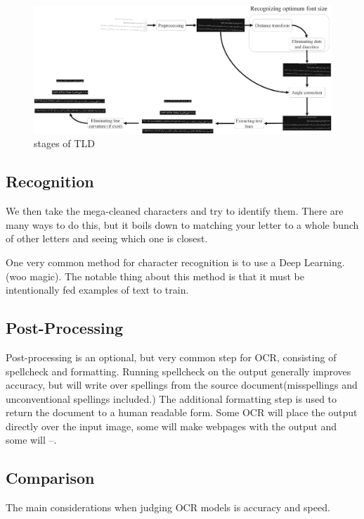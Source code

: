 \documentclass[sigplan,screen,nonacm]{acmart-tagged}
\begin{document}
\begin{figure}
  \includegraphics[width=\linewidth]{TLD.png}
  \caption{stages of TLD}
  \label{fig:tld}
\end{figure}

\subsection{Recognition}
\label{Recognition}

We then take the mega-cleaned characters and try to identify them. There are many ways to do this, but it boils down to matching your letter to a whole bunch of other letters and seeing which one is closest.

One very common method for character recognition is to use a Deep Learning. (woo magic). The notable thing about this method is that it must be intentionally fed examples of text to train.

\subsection{Post-Processing}
\label{sec:Post-Processing}

Post-processing is an optional, but very common step for OCR, consisting of spellcheck and formatting. Running spellcheck on the output generally improves accuracy, but will write over spellings from the source document(misspellings and unconventional spellings included.) The additional formatting step is used to return the document to a human readable form. Some OCR will place the output directly over the input image, some will make webpages with the output and some will --.

\subsection{Comparison}
\label{comparison}

The main considerations when judging OCR models is accuracy and speed.\citep{Raj:2022} 
\end{document}
